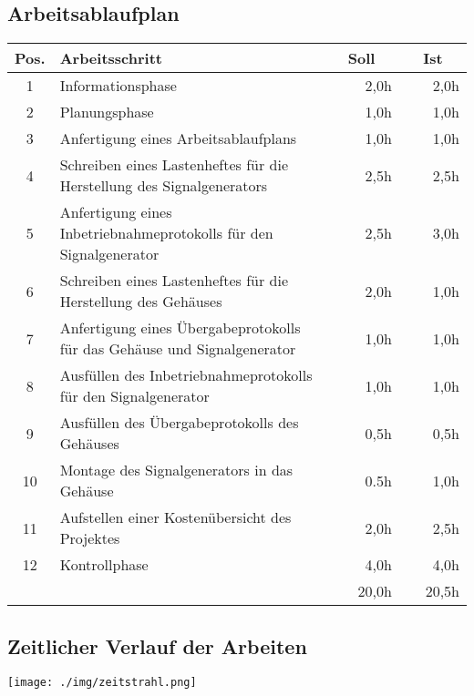 \begin{landscape}

\section{Arbeitsablaufplan}
\begin{center}
\begin{tabular}{ll|r|r|}
\hline
\multicolumn{1}{|c|}{Pos.} & Arbeitsschritt & ~~Soll~~ & ~~Ist~~ \\ \hline
\multicolumn{1}{|c|}{1} & Informationsphase & 2,0h & 2,0h \\ \hline
\multicolumn{1}{|c|}{2} & Planungsphase & 1,0h & 1,0h \\ \hline
\multicolumn{1}{|c|}{3} & Anfertigung eines Arbeitsablaufplans & 1,0h & 1,0h \\ \hline
\multicolumn{1}{|c|}{4} & Schreiben eines Lastenheftes für die Herstellung des Signalgenerators & 2,5h & 2,5h \\ \hline
\multicolumn{1}{|c|}{5} & Anfertigung eines Inbetriebnahmeprotokolls für den Signalgenerator & 2,5h & 3,0h \\ \hline
\multicolumn{1}{|c|}{6} & Schreiben eines Lastenheftes für die Herstellung des Gehäuses & 2,0h & 1,0h \\ \hline
\multicolumn{1}{|c|}{7} & Anfertigung eines Übergabeprotokolls für das Gehäuse und Signalgenerator & 1,0h & 1,0h \\ \hline
\multicolumn{1}{|c|}{8} & Ausfüllen des Inbetriebnahmeprotokolls für den Signalgenerator & 1,0h & 1,0h \\ \hline
\multicolumn{1}{|c|}{9} & Ausfüllen des Übergabeprotokolls des Gehäuses & 0,5h & 0,5h \\ \hline
\multicolumn{1}{|c|}{10} & Montage des Signalgenerators in das Gehäuse & 0.5h & 1,0h \\ \hline
\multicolumn{1}{|c|}{11} & Aufstellen einer Kostenübersicht des Projektes & 2,0h & 2,5h \\ \hline
\multicolumn{1}{|c|}{12} & Kontrollphase & 4,0h & 4,0h \\ \hline
                       &  & 20,0h & 20,5h \\ \cline{3-4} 
\end{tabular}
\end{center}
\pagebreak
\subsection{Zeitlicher Verlauf der Arbeiten}
\begin{center}
\texttt{[image: ./img/zeitstrahl.png]}
\end{center}
\end{landscape}
